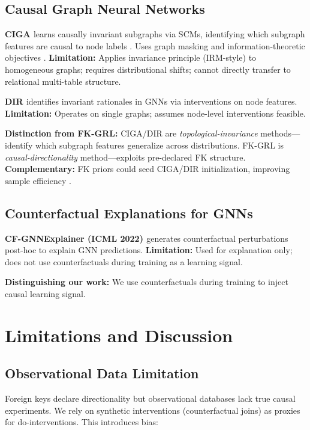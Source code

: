 \documentclass[11pt,letterpaper]{article}
\begin{document}
\subsection{Causal Graph Neural Networks}

\textbf{CIGA \cite{Zhu2022}} learns causally invariant subgraphs via SCMs, identifying which subgraph features are causal to node labels \cite{Zhu2022}. Uses graph masking and information-theoretic objectives \cite{Zhu2022}. \textbf{Limitation:} Applies invariance principle (IRM-style) to homogeneous graphs; requires distributional shifts; cannot directly transfer to relational multi-table structure.

\textbf{DIR \cite{Wu2022}} identifies invariant rationales in GNNs via interventions on node features. \textbf{Limitation:} Operates on single graphs; assumes node-level interventions feasible.

\textbf{Distinction from FK-GRL:} CIGA/DIR are \textit{topological-invariance} methods---identify which subgraph features generalize across distributions. FK-GRL is \textit{causal-directionality} method---exploits pre-declared FK structure. \textbf{Complementary:} FK priors could seed CIGA/DIR initialization, improving sample efficiency \cite{Zhu2022}.

\subsection{Counterfactual Explanations for GNNs}

\textbf{CF-GNNExplainer (ICML 2022) \cite{SanchezMartin2022}} generates counterfactual perturbations post-hoc to explain GNN predictions. \textbf{Limitation:} Used for explanation only; does not use counterfactuals during training as a learning signal.

\textbf{Distinguishing our work:} We use counterfactuals during training to inject causal learning signal.

\section{Limitations and Discussion}

\subsection{Observational Data Limitation}

Foreign keys declare directionality but observational databases lack true causal experiments. We rely on synthetic interventions (counterfactual joins) as proxies for do-interventions. This introduces bias:
\end{document}
